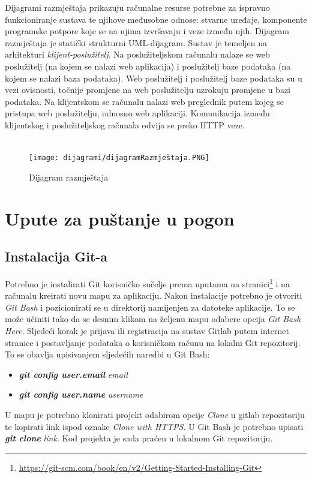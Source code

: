 			Dijagrami razmještaja prikazuju računalne resurse potrebne za ispravno funkcioniranje sustava te njihove međusobne odnose: stvarne uređaje, komponente programske potpore koje se na njima izvršavaju i veze između njih. Dijagram razmještaja je statički strukturni UML-dijagram.\newline
			\indent Sustav je temeljen na arhitekturi \textit{klijent-poslužitelj}. Na poslužiteljskom računalu nalaze se web poslužitelj (na kojem se nalazi web aplikacija) i poslužitelj baze podataka (na kojem se nalazi baza podataka). Web poslužitelj i poslužitelj baze podataka su u vezi ovisnosti, točnije promjene na web poslužitelju uzrokuju promjene u bazi podataka. Na klijentskom se računalu nalazi web preglednik putem kojeg se pristupa web poslužitelju, odnosno web aplikaciji. Komunikacija između klijentskog i poslužiteljskog računala odvija se preko HTTP veze.\\\\
			
			\begin{figure}[htb]
				\centering
				\texttt{[image: dijagrami/dijagramRazmještaja.PNG]}
				\caption{Dijagram razmještaja}
				\label{fig: dijagram razmještaja}
			\end{figure}
			
			\eject 
		
		\section{Upute za puštanje u pogon}
		
			\subsection{Instalacija Git-a}
				Potrebno je instalirati Git korisničko sučelje prema uputama na stranici\footnote{\url{https://git-scm.com/book/en/v2/Getting-Started-Installing-Git}} i na računalu kreirati novu mapu za aplikaciju. Nakon instalacije potrebno je otvoriti \textit{Git Bash} i pozicionirati se u direktorij namijenjen za datoteke aplikacije. To se može učiniti tako da se desnim klikom na željenu mapu odabere opcija \textit{Git Bash Here}. Sljedeći korak je prijava ili registracija na sustav Gitlab putem internet stranice i postavljanje podataka o korisničkom računu na lokalni Git repozitorij. To se obavlja upisivanjem sljedećih naredbi u Git Bash:
					\begin{itemize}
						\item \textit{\textbf{git config user.email}} \textit{email}
						\item \textit{\textbf{git config user.name}} \textit{username}
					\end{itemize}
				U mapu je potrebno klonirati projekt odabirom opcije \textit{Clone} u gitlab repozitoriju te kopirati link ispod oznake \textit{Clone with HTTPS}. U Git Bash je potrebno upisati \textbf{\textit{git clone}} \textit{link}. Kod projekta je sada praćen u lokalnom Git repozitoriju.\\
				
